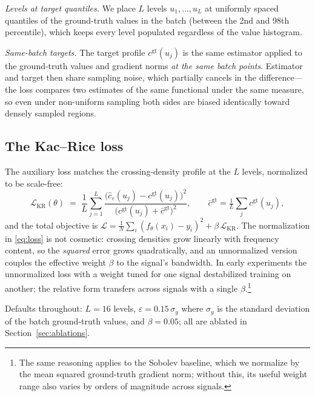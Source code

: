 \documentclass[10pt]{article}
\newcommand{\loss}{\mathcal{L}}
\begin{document}
\emph{Levels at target quantiles.} We place $L$ levels $u_1,\dots,u_L$ at uniformly
spaced quantiles of the ground-truth values in the batch (between the 2nd and 98th
percentile), which keeps every level populated regardless of the value histogram.

\emph{Same-batch targets.} The target profile $c^{\mathrm{gt}}(u_j)$ is the same
estimator applied to the ground-truth values and gradient norms \emph{at the same batch
points}. Estimator and target then share sampling noise, which partially cancels in the
difference---the loss compares two estimates of the same functional under the same
measure, so even under non-uniform sampling both sides are biased identically toward
densely sampled regions.

\subsection{The Kac--Rice loss}
\label{sec:loss}

The auxiliary loss matches the crossing-density profile at the $L$ levels, normalized to
be scale-free:
\begin{equation}
\loss_{\mathrm{KR}}(\theta)
\;=\;
\frac1L \sum_{j=1}^{L}
\frac{\bigl(\hat c_\varepsilon(u_j) - c^{\mathrm{gt}}(u_j)\bigr)^2}
     {\bigl(c^{\mathrm{gt}}(u_j) + \bar c^{\mathrm{gt}}\bigr)^2},
\qquad
\bar c^{\mathrm{gt}} = \tfrac1L\textstyle\sum_j c^{\mathrm{gt}}(u_j),
\label{eq:loss}
\end{equation}
and the total objective is
$\loss = \frac1N\sum_i (f_\theta(x_i)-y_i)^2 + \beta\,\loss_{\mathrm{KR}}$.
The normalization in \eqref{eq:loss} is not cosmetic: crossing densities grow linearly
with frequency content, so the \emph{squared} error grows quadratically, and an
unnormalized version couples the effective weight $\beta$ to the signal's bandwidth. In
early experiments the unnormalized loss with a weight tuned for one signal destabilized
training on another; the relative form transfers across signals with a single
$\beta$.\footnote{The same reasoning applies to the Sobolev baseline, which we normalize
by the mean squared ground-truth gradient norm; without this, its useful weight range
also varies by orders of magnitude across signals.}

Defaults throughout: $L=16$ levels, $\varepsilon=0.15\,\sigma_y$ where $\sigma_y$ is the
standard deviation of the batch ground-truth values, and $\beta=0.05$; all are ablated
in Section~\ref{sec:ablations}.
\end{document}
